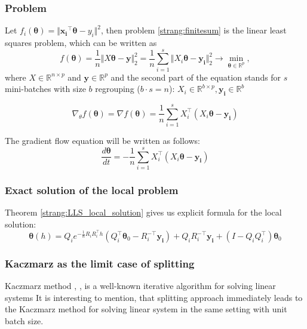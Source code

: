 \documentclass{article}
\newcommand{\vect}[1]{\boldsymbol{\mathbf{#1}}}
\begin{document}
\subsubsection{Problem}
Let $f_i(\vect{\theta}) = \Vert \vect{x_i}^{\top} \vect{\theta} - y_i \Vert^2$, then problem \eqref{strang:finitesum} is the linear least squares problem, which can be written as
\begin{equation}\label{strang:LLS}
   f(\vect{\theta}) = \frac{1}{n}\Vert X \vect{\theta} - \vect{y} \Vert_2^2  = \frac{1}{n}\sum\limits_{i=1}^s\Vert X_i \vect{\theta} - \vect{y_i} \Vert_2^2\to \min_{\vect{\theta} \in \mathbb{R}^p},
\end{equation}
where $X \in \mathbb{R}^{n \times p}$ and $\vect{y} \in \mathbb{R}^p$ and the second part of the equation stands for $s$ mini-batches with size $b$ regrouping ($b \cdot s = n$): $X_i \in \mathbb{R}^{b \times p}, \vect{y_i} \in \mathbb{R}^{b}$

\begin{equation}\label{strang:LLS_grad}
\nabla_\theta f(\vect{\theta}) = \nabla f(\vect{\theta}) = \frac{1}{n}\sum\limits_{i=1}^s X_i^\top(X_i \vect{\theta} - \vect{y_i})
\end{equation}

The gradient flow equation will be written as follows:
\begin{equation}\label{strang:LLS_GF}
\frac{d \vect{\theta}}{d t} = - \frac{1}{n}\sum\limits_{i=1}^s X_i^\top( X_i \vect{\theta} - \vect{y_i})
\end{equation}

\subsubsection{Exact solution of the local problem}
Theorem \ref{strang:LLS_local_solution} gives us explicit formula for the local solution:
$$
\vect{\theta}(h) = Q_i e^{-\frac{1}{n}R_iR_i^\top h} \left( Q_i^\top \vect{\theta}_0 - R_i^{-\top}\vect{y_i}\right) + Q_iR_i^{-\top}\vect{y_i} + (I - Q_iQ_i^\top)\vect{\theta}_0
$$

\subsubsection{Kaczmarz as the limit case of splitting}
Kaczmarz method \citet{kaczmarz1937method}, \citet{strohmer2009randomized}, \citet{gower2015randomized} is a well-known iterative algorithm for solving linear systems
It is interesting to mention, that splitting approach immediately leads to the Kaczmarz method for solving linear system in the same setting with unit batch size.
\end{document}

